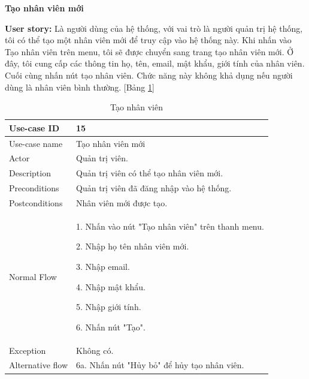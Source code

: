 \textbf{Tạo nhân viên mới}\par
\textbf{User story:} Là người dùng của hệ thống, với vai trò là người quản trị hệ thống, tôi có thể tạo một nhân viên mới để truy cập vào hệ thống này. Khi nhấn vào Tạo nhân viên trên menu, tôi sẽ được chuyển sang trang tạo nhân viên mới. Ở đây, tôi cung cấp các thông tin họ, tên, email, mật khẩu, giới tính của nhân viên. Cuối cùng nhấn nút tạo nhân viên. Chức năng này không khả dụng nếu người dùng là nhân viên bình thường. [Bảng \ref{bang15}]
\begin{table}[H]
    \centering
    \begin{tabular}{|m{3cm}|m{10cm}|}
    \hline 
        Use-case ID & 15\\ \hline
        Use-case name & Tạo nhân viên mới\\ \hline
        Actor & Quản trị viên.\\ \hline
        Description & Quản trị viên có thể tạo nhân viên mới.\\ \hline
        Preconditions & Quản trị viên đã đăng nhập vào hệ thống.\\ \hline
        Postconditions & Nhân viên mới được tạo.\\ \hline
        Normal Flow & 
        1. Nhấn vào nút "Tạo nhân viên" trên thanh menu.\par 
        2. Nhập họ tên nhân viên mới.\par
        3. Nhập email.\par
        4. Nhập mật khẩu.\par
        5. Nhập giới tính.\par
        6. Nhấn nút "Tạo".
        \\ \hline
        Exception & Không có.
        \\ \hline
        Alternative flow & 
        6a. Nhấn nút "Hủy bỏ" để hủy tạo nhân viên.
        \\ 
    \hline 
    \end{tabular}
    \caption{Tạo nhân viên}
    \label{bang15}
\end{table}


